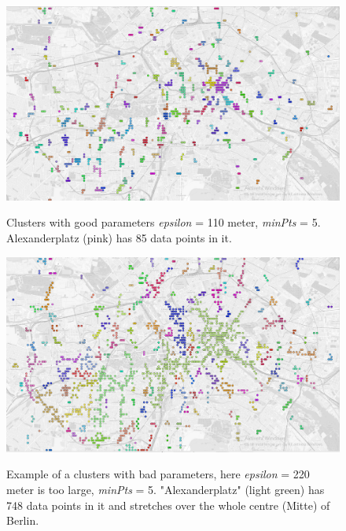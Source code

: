 
\begin{figure}[!ht]
	\centering
	\includegraphics[width=1\textwidth]{images/0,001_5_gray.png}\\
	\caption{ Clusters with good parameters \textit{epsilon} = 110 meter, \textit{minPts} = 5. Alexanderplatz (pink) has 85 data points in it.  }
	\label{fig:0.001_5_gray}
\end{figure}

\begin{figure}[!ht]
	\centering
	\includegraphics[width=1\textwidth]{images/0,002_5_gray.png}\\
	\caption{ Example of a clusters with bad parameters, here \textit{epsilon} = 220 meter is too large, \textit{minPts} = 5. "Alexanderplatz" (light green) has 748 data points in it and stretches over the whole centre (Mitte) of Berlin. }
	\label{fig:002_5_gray}
\end{figure}
 

